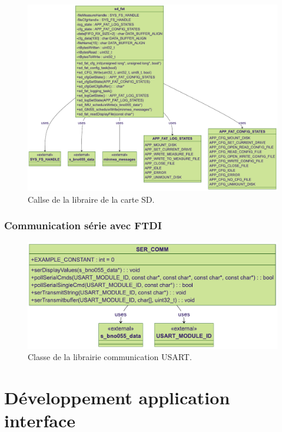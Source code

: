 \begin{figure}[H]
	\centering
	\includegraphics[width=1\linewidth]{../figures/code/diagrammes/sd-card-class}
	\caption{Callse de la libraire de la carte SD.}
	\label{fig:sd-card-class}
\end{figure}

\subsubsection{Communication série avec FTDI}

\begin{figure}[H]
	\centering
	\includegraphics[width=1\linewidth]{../figures/code/diagrammes/ser-com-class}
	\caption{Classe de la librairie communication USART.}
	\label{fig:ser-com-class}
\end{figure}

\clearpage

\section{Développement application interface}

